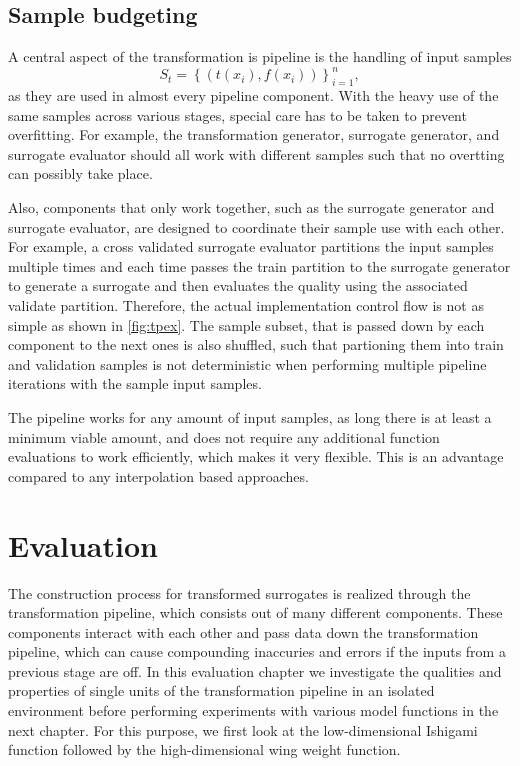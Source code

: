 \documentclass[
  a4paper,  %
  twoside,  %
  bibliography=totoc,
  headsepline,
  cleardoublepage=empty,
  parskip=half,
  draft=false
]{scrbook}
\begin{document}
\section{Sample budgeting}

A central aspect of the transformation is pipeline is the handling of input samples
\begin{equation}
S_t=\left\{(t(x_i), f(x_i))\right\}_{i=1}^n,
\nonumber
\end{equation}
as they are used in almost every pipeline component.
With the heavy use of the same samples across various stages, special care has to be taken to prevent overfitting.
For example, the transformation generator, surrogate generator, and surrogate evaluator should all work with different samples such that no overtting can possibly take place.

Also, components that only work together, such as the surrogate generator and surrogate evaluator, are designed to coordinate their sample use with each other.
For example, a cross validated surrogate evaluator partitions the input samples multiple times and each time passes the train partition to the surrogate generator to generate a surrogate and then evaluates the quality using the associated validate partition.
Therefore, the actual implementation control flow is not as simple as shown in \cref{fig:tpex}.
The sample subset, that is passed down by each component to the next ones is also shuffled, such that partioning them into train and validation samples is not deterministic when performing multiple pipeline iterations with the sample input samples.

The pipeline works for any amount of input samples, as long there is at least a minimum viable amount, and does not require any additional function evaluations to work efficiently, which makes it very flexible.
This is an advantage compared to any interpolation based approaches.

\chapter{Evaluation}
\label{chap:c7}

The construction process for transformed surrogates is realized through the transformation pipeline, which consists out of many different components.
These components interact with each other and pass data down the transformation pipeline, which can cause compounding inaccuries and errors if the inputs from a previous stage are off.
In this evaluation chapter we investigate the qualities and properties of single units of the transformation pipeline in an isolated environment before performing experiments with various model functions in the next chapter.
For this purpose, we first look at the low-dimensional Ishigami function followed by the high-dimensional wing weight function.
\end{document}
